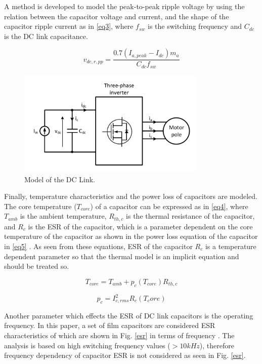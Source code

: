 \documentclass[conference,a4paper,twocolumn]{IEEEtran}
\begin{document}
A method is developed to model the peak-to-peak ripple voltage by using the relation between the capacitor voltage and current, and the shape of the capacitor ripple current as in \ref{eq3}, where $f_{sw}$ is the switching frequency and $C_{dc}$ is the DC link capacitance.

\begin{equation}
\label{eq3}
v_{dc,r,pp} = \frac{0.7(I_{a,peak}-I_{dc})m_a}{C_{dc}f_{sw}}
\end{equation}

\begin{figure}[h]
  \centering
  \includegraphics[width=9cm]{fig3}
  \caption{Model of the DC Link.}
  \label{fig3}
\end{figure}

Finally, temperature characteristics and the power loss of capacitors are modeled. The core temperature ($T_{core}$) of a capacitor can be expressed as in \ref{eq4}, where $T_{amb}$ is the ambient temperature, $R_{th,c}$ is the thermal resistance of the capacitor, and $R_c$ is the ESR of the capacitor, which is a parameter dependent on the core temperature of the capacitor as shown in the power loss equation of the capacitor in \ref{eq5} \cite{Bianchi2003}. As seen from these equations, ESR of the capacitor $R_c$ is a temperature dependent parameter so that the thermal model is an implicit equation and should be treated so.


\begin{equation}
\label{eq4}
T_{core} = T_{amb}+p_{c}(T_{core})R_{th,c}
\end{equation}


\begin{equation}
\label{eq5}
p_{c} = I_{c,rms}^2R_{c}(T_core)
\end{equation}

Another parameter which effects the ESR of DC link capacitors is the operating frequency. In this paper, a set of film capacitors are considered ESR characteristics of which are shown in Fig. \ref{esr} in terms of frequency \cite{Polypropylene2009}. The analysis is based on high switching frequency values ($>10kHz$), therefore frequency dependency of capacitor ESR is not considered as seen in Fig. \ref{esr}. 
\end{document}

